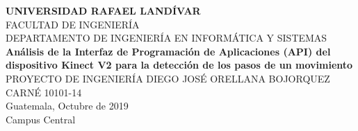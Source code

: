 \begin{titlepage}
\begin{center}
{\LARGE \textbf{UNIVERSIDAD RAFAEL LAND\'IVAR}}\\[0.1cm]
{\normalsize FACULTAD DE INGENIER\'IA}\\[0.1cm]
{\normalsize DEPARTAMENTO DE INGENIER\'IA EN INFORM\'ATICA Y SISTEMAS}\\[4cm]
{\huge \textbf{An\'alisis de
la Interfaz de Programaci\'on de Aplicaciones (API) del dispositivo Kinect V2 para la detecci\'on de
los pasos de un movimiento}}\\[0.1cm]
{\LARGE PROYECTO DE INGENIER\'IA}
\vfill
DIEGO JOS\'E ORELLANA BOJORQUEZ\\[0.1cm]
CARN\'E 10101-14\\[2cm]
Guatemala, Octubre de 2019\\[0.1cm]
Campus Central
\afterpage{\blankpage}
\end{center}
\end{titlepage}
